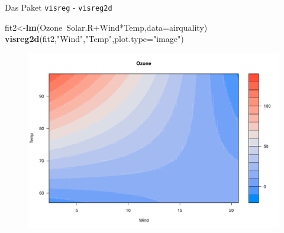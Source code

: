 \documentclass[ignorenonframetext,]{beamer}
\newenvironment{Shaded}{}{}
\newcommand{\KeywordTok}[1]{\textcolor[rgb]{0.00,0.44,0.13}{\textbf{{#1}}}}
\newcommand{\DataTypeTok}[1]{\textcolor[rgb]{0.56,0.13,0.00}{{#1}}}
\newcommand{\StringTok}[1]{\textcolor[rgb]{0.25,0.44,0.63}{{#1}}}
\newcommand{\NormalTok}[1]{{#1}}
\begin{document}
\begin{frame}[fragile]{Das Paket \texttt{visreg} - \texttt{visreg2d}}

\begin{Shaded}
\begin{Highlighting}[]
\NormalTok{fit2<-}\KeywordTok{lm}\NormalTok{(Ozone~Solar.R+Wind*Temp,}\DataTypeTok{data=}\NormalTok{airquality)}
\KeywordTok{visreg2d}\NormalTok{(fit2,}\StringTok{"Wind"}\NormalTok{,}\StringTok{"Temp"}\NormalTok{,}\DataTypeTok{plot.type=}\StringTok{"image"}\NormalTok{)}
\end{Highlighting}
\end{Shaded}

\begin{figure}[htbp]
\centering
\includegraphics{RSocialScience2_files/figure-beamer/unnamed-chunk-88-1.pdf}
\caption{}
\end{figure}

\end{frame}
\end{document}
